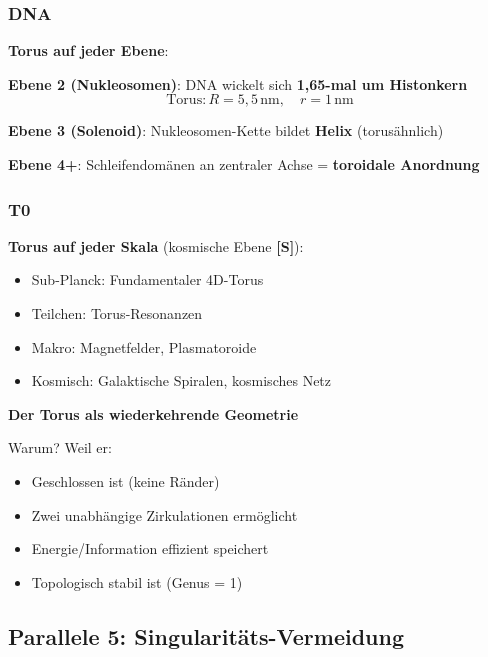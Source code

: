 	\subsubsection{DNA}

	\textbf{Torus auf jeder Ebene}:

	\textbf{Ebene 2 (Nukleosomen)}: DNA wickelt sich \textbf{1,65-mal um Histonkern}
	\begin{equation}
		\text{Torus}: R = 5{,}5\,\text{nm}, \quad r = 1\,\text{nm}
	\end{equation}

	\textbf{Ebene 3 (Solenoid)}: Nukleosomen-Kette bildet \textbf{Helix} (torusähnlich)

	\textbf{Ebene 4+}: Schleifendomänen an zentraler Achse = \textbf{toroidale Anordnung}

	\subsubsection{T0}

	\textbf{Torus auf jeder Skala} (kosmische Ebene \textbf{[S]}):
	\begin{itemize}
		\item Sub-Planck: Fundamentaler 4D-Torus
		\item Teilchen: Torus-Resonanzen
		\item Makro: Magnetfelder, Plasmatoroide
		\item Kosmisch: Galaktische Spiralen, kosmisches Netz
	\end{itemize}

	\begin{keyresult}
		\textbf{Der Torus als wiederkehrende Geometrie}

		Warum? Weil er:
		\begin{itemize}
			\item Geschlossen ist (keine Ränder)
			\item Zwei unabhängige Zirkulationen ermöglicht
			\item Energie/Information effizient speichert
			\item Topologisch stabil ist (Genus = 1)
		\end{itemize}
	\end{keyresult}

	\subsection{Parallele 5: Singularitäts-Vermeidung}

